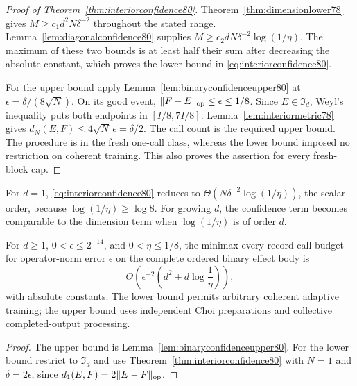 \begin{proof}[Proof of Theorem~\ref{thm:interiorconfidence80}]
Theorem~\ref{thm:dimensionlower78} gives
$M\ge c_1d^2N\delta^{-2}$ throughout the stated range.
Lemma~\ref{lem:diagonalconfidence80} supplies
$M\ge c_2dN\delta^{-2}\log(1/\eta)$.
The maximum of these two bounds is at least half their sum after
decreasing the absolute constant, which proves the lower bound in
\eqref{eq:interiorconfidence80}.

For the upper bound apply Lemma~\ref{lem:binaryconfidenceupper80}
at $\epsilon=\delta/(8\sqrt N)$.  On its good event,
$\|F-E\|_{\rm op}\le\epsilon\le1/8$.  Since $E\in\mathfrak I_d$,
Weyl's inequality puts both endpoints in $[I/8,7I/8]$.
Lemma~\ref{lem:interiormetric78} gives
$d_N(E,F)\le4\sqrt N\,\epsilon=\delta/2$.
The call count is the required upper bound.  The procedure is in
the fresh one-call class, whereas the lower bound imposed no
restriction on coherent training.  This also proves the assertion
for every fresh-block cap.
\end{proof}

For $d=1$, \eqref{eq:interiorconfidence80} reduces to
$\Theta(N\delta^{-2}\log(1/\eta))$, the scalar order, because
$\log(1/\eta)\ge\log8$.  For growing $d$, the confidence term
becomes comparable to the dimension term when
$\log(1/\eta)$ is of order $d$.

\begin{corollary}
\label{cor:operatorconfidence80}
For $d\ge1$, $0<\epsilon\le2^{-14}$, and $0<\eta\le1/8$,
the minimax every-record call budget for operator-norm error
$\epsilon$ on the complete ordered binary effect body is
\begin{equation}\label{eq:operatorconfidence80}
 \Theta\!\left(\epsilon^{-2}
                   \left(d^2+d\log\frac1\eta\right)\right),
\end{equation}
with absolute constants.  The lower bound permits arbitrary
coherent adaptive training; the upper bound uses independent Choi
preparations and collective completed-output processing.
\end{corollary}
\begin{proof}
The upper bound is Lemma~\ref{lem:binaryconfidenceupper80}.
For the lower bound restrict to $\mathfrak I_d$ and use
Theorem~\ref{thm:interiorconfidence80} with $N=1$ and
$\delta=2\epsilon$, since $d_1(E,F)=2\|E-F\|_{\rm op}$.
\end{proof}

